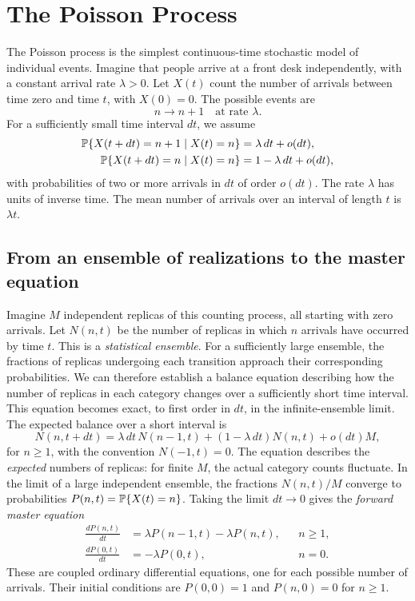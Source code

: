 \section{The Poisson Process}
\label{subsection:Poisson_Process}

The Poisson process is the simplest continuous-time stochastic model of individual events. Imagine that people arrive at a front desk independently, with a constant arrival rate $\lambda>0$. Let $X(t)$ count the number of arrivals between time zero and time $t$, with $X(0)=0$. The possible events are 
\begin{equation}
 n\longrightarrow n+1 \quad\text{at rate }\lambda.
\end{equation}
For a sufficiently small time interval $dt$, we assume
\begin{align}
 {\mathbb P}\{X(t+dt)=n+1\mid X(t)=n\}&=\lambda\,dt+o(dt),\\
 {\mathbb P}\{X(t+dt)=n\mid X(t)=n\}&=1-\lambda\,dt+o(dt),
\end{align}
with probabilities of two or more arrivals in $dt$ of order $o(dt)$. The rate $\lambda$ has units of inverse time. The mean number of arrivals over an interval of length $t$ is $\lambda t$.

\subsection{From an ensemble of realizations to the master equation}
Imagine $M$ independent replicas of this counting process, all starting with zero arrivals. Let $N(n,t)$ be the number of replicas in which $n$ arrivals have occurred by time $t$. This is a \emph{statistical ensemble}. For a sufficiently large ensemble, the fractions of replicas undergoing each transition approach their corresponding probabilities. We can therefore establish a balance equation describing how the number of replicas in each category changes over a sufficiently short time interval. This equation becomes exact, to first order in \(dt\), in the infinite-ensemble limit. The expected balance over a short interval is
\begin{equation}
 N(n,t + dt) =\lambda\,dt\,N(n-1,t)+(1-\lambda\,dt)N(n,t)+o(dt)M,
\end{equation}
for $n\geq1$, with the convention $N(-1,t)=0$. The equation describes the
\emph{expected} numbers of replicas: for finite $M$, the actual category counts fluctuate. In the limit of a large independent ensemble, the fractions
$N(n,t)/M$ converge to probabilities $P(n,t)={\mathbb P}\{X(t)=n\}$.
Taking the limit $dt\to0$ gives the \emph{forward master equation}
\begin{align}
 \frac{dP(n,t)}{dt}&=\lambda P(n-1,t)-\lambda P(n,t),&&n\geq1,
 \label{ME_Final_Poisson_n}\\
 \frac{dP(0,t)}{dt}&=-\lambda P(0,t),&&n=0.
 \label{ME_Final_Poisson}
\end{align}
These are coupled ordinary differential equations, one for each possible
number of arrivals. Their initial conditions are $P(0,0)=1$ and
$P(n,0)=0$ for $n\geq1$.

